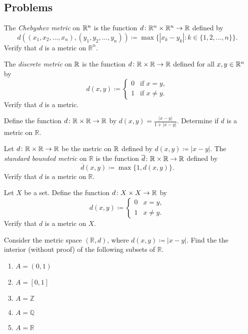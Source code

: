 \documentclass[../main.tex]{subfiles}
\begin{document}
\subsection{Problems}
\begin{homework}
    The \textit{Chebyshev metric} on $\mathbb R^n$ is the function $d\colon\mathbb R^n \times \mathbb R^n \rightarrow \mathbb R$ defined by
    \[d((x_1,x_2,\ldots,x_n),(y_1,y_2,\ldots,y_n)) \coloneqq \max\{|x_k-y_k|:k\in\{1,2,\ldots,n\}\}.\]
    Verify that $d$ is a metric on $\mathbb{R}^n$.
\end{homework}
\begin{homework}
    The \textit{discrete metric} on $\mathbb R$ is the function $d\colon\mathbb R\times\mathbb R \rightarrow \mathbb R$ defined for all $x,y \in \mathbb R^n $ by
    \[d(x,y) \coloneqq \begin{cases}
        0 & \text{if } x=y, \\
        1 & \text{if } x\ne y.
    \end{cases}\]
    Verify that $d$ is a metric.
\end{homework}
\begin{homework}
    Define the function $d\colon\mathbb R\times\mathbb R\to\mathbb R$ by $d(x,y) = \frac{|x-y|}{1 + |x-y|}$. Determine if $d$ is a metric on $\mathbb{R}$.
\end{homework}
\begin{homework}
    Let $d\colon\mathbb R\times\mathbb R\to\mathbb R$ be the metric on $\mathbb R$ defined by $d(x,y)\coloneqq|x-y|$. The \textit{standard bounded metric} on $\mathbb{R}$ is the function $\overline{d}\colon\mathbb R \times \mathbb R \rightarrow \mathbb R$ defined by
    \[\overline d(x,y)\coloneqq\max\{1,d(x,y)\}.\]
    Verify that $d$ is a metric on $\mathbb{R}$.
\end{homework}
\begin{homework}
    Let $X$ be a set. Define the function $d\colon X\times X\to\mathbb R$ by
    \[d(x,y)\coloneqq\begin{cases}
        0 & x=y, \\
        1 & x\ne y.
    \end{cases}\]
    Verify that $d$ is a metric on $X$.
\end{homework}
\begin{homework} \label{prop:many-ints}
    Consider the metric space $(\mathbb{R}, d)$, where $d(x,y)\coloneqq|x - y|$. Find the the interior (without proof) of the following subsets of $\mathbb{R}$. 
    \begin{enumerate}[label=(\alph*)]
        \item $A = (0, 1)$
        \item $A = [0,1]$
        \item $A = \mathbb{Z}$
        \item $A = \mathbb{Q}$
        \item $A = \mathbb{R}$
    \end{enumerate}
\end{homework}
\end{document}
